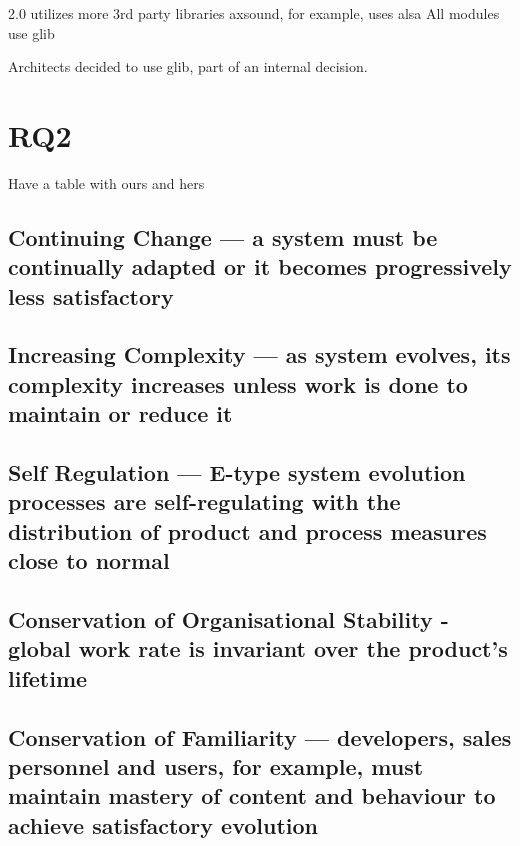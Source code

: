\documentclass[conference]{IEEEtran}
\begin{document}
2.0 utilizes more 3rd party libraries
axsound, for example, uses alsa
All modules use glib





Architects decided to use glib, part of an internal decision. 
















\section{RQ2}
Have a table with ours and hers


\subsection{Continuing Change — a system must be continually adapted or it becomes progressively less satisfactory}


\subsection{Increasing Complexity — as system evolves, its complexity increases unless work is done to maintain or reduce it}


\subsection{Self Regulation — E-type system evolution processes are self-regulating with the distribution of product and process measures close to normal}

\subsection{Conservation of Organisational Stability - global work rate is invariant over the product's lifetime}

\subsection{Conservation of Familiarity — developers, sales personnel and users, for example, must maintain mastery of content and behaviour to achieve satisfactory evolution}
\end{document}
